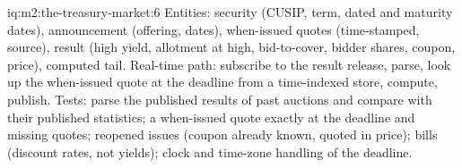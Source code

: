 \begin{solution}{iq:m2:the-treasury-market:6}
Entities: security (CUSIP, term, dated and maturity dates), announcement
(offering, dates), when-issued quotes (time-stamped, source), result (high
yield, allotment at high, bid-to-cover, bidder shares, coupon, price),
computed tail. Real-time path: subscribe to the result release, parse, look
up the when-issued quote at the deadline from a time-indexed store, compute,
publish. Tests: parse the published results of past auctions and compare with
their published statistics; a when-issued quote exactly at the deadline and
missing quotes; reopened issues (coupon already known, quoted in price);
bills (discount rates, not yields); clock and time-zone handling of the
deadline.
\end{solution}
